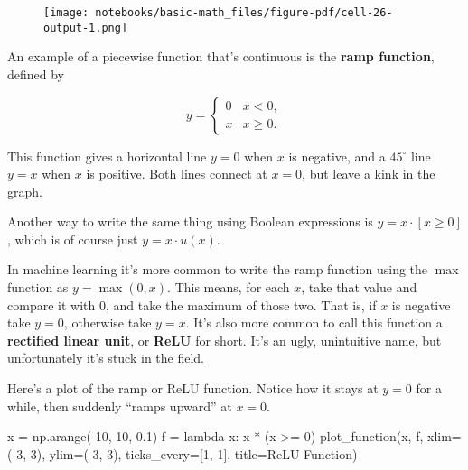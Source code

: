 \documentclass[
  letterpaper,
  DIV=11,
  numbers=noendperiod]{scrreprt}
\newenvironment{Shaded}{\begin{snugshade}}{\end{snugshade}}
\newcommand{\DecValTok}[1]{\textcolor[rgb]{0.68,0.00,0.00}{#1}}
\newcommand{\FloatTok}[1]{\textcolor[rgb]{0.68,0.00,0.00}{#1}}
\newcommand{\KeywordTok}[1]{\textcolor[rgb]{0.00,0.23,0.31}{#1}}
\newcommand{\NormalTok}[1]{\textcolor[rgb]{0.00,0.23,0.31}{#1}}
\newcommand{\OperatorTok}[1]{\textcolor[rgb]{0.37,0.37,0.37}{#1}}
\newcommand{\StringTok}[1]{\textcolor[rgb]{0.13,0.47,0.30}{#1}}
\begin{document}
\begin{figure}[H]

{\centering \texttt{[image: notebooks/basic-math\_files/figure-pdf/cell-26-output-1.png]}

}

\end{figure}

An example of a piecewise function that's continuous is the \textbf{ramp
function}, defined by

\[
y = 
\begin{cases}
0 & x < 0, \\
x & x \geq 0.
\end{cases}
\]

This function gives a horizontal line \(y=0\) when \(x\) is negative,
and a \(45^\circ\) line \(y=x\) when \(x\) is positive. Both lines
connect at \(x=0\), but leave a kink in the graph.

Another way to write the same thing using Boolean expressions is
\(y = x \cdot [x \geq 0]\), which is of course just
\(y = x \cdot u(x)\).

In machine learning it's more common to write the ramp function using
the \(\max\) function as \(y = \max(0,x)\). This means, for each \(x\),
take that value and compare it with \(0\), and take the maximum of those
two. That is, if \(x\) is negative take \(y=0\), otherwise take \(y=x\).
It's also more common to call this function a \textbf{rectified linear
unit}, or \textbf{ReLU} for short. It's an ugly, unintuitive name, but
unfortunately it's stuck in the field.

Here's a plot of the ramp or ReLU function. Notice how it stays at
\(y=0\) for a while, then suddenly ``ramps upward'' at \(x=0\).

\begin{Shaded}
\begin{Highlighting}[]
\NormalTok{x }\OperatorTok{=}\NormalTok{ np.arange(}\OperatorTok{{-}}\DecValTok{10}\NormalTok{, }\DecValTok{10}\NormalTok{, }\FloatTok{0.1}\NormalTok{)}
\NormalTok{f }\OperatorTok{=} \KeywordTok{lambda}\NormalTok{ x:  x }\OperatorTok{*}\NormalTok{ (x }\OperatorTok{\textgreater{}=} \DecValTok{0}\NormalTok{)}
\NormalTok{plot\_function(x, f, xlim}\OperatorTok{=}\NormalTok{(}\OperatorTok{{-}}\DecValTok{3}\NormalTok{, }\DecValTok{3}\NormalTok{), ylim}\OperatorTok{=}\NormalTok{(}\OperatorTok{{-}}\DecValTok{3}\NormalTok{, }\DecValTok{3}\NormalTok{), ticks\_every}\OperatorTok{=}\NormalTok{[}\DecValTok{1}\NormalTok{, }\DecValTok{1}\NormalTok{], }
\NormalTok{              title}\OperatorTok{=}\StringTok{\textquotesingle{}ReLU Function\textquotesingle{}}\NormalTok{)}
\end{Highlighting}
\end{Shaded}
\end{document}
